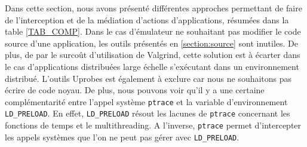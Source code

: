 Dans cette section, nous avons présenté différentes approches permettant de
faire de l'interception et de la médiation d'actions d'applications, résumées
dans la table \ref{TAB_COMP}. Dans le cas d'émulateur ne souhaitant pas modifier
le code source d'une application, les outils présentés en \ref{section:source}
sont inutiles. De plus, de par le surcoût d'utilisation de Valgrind, cette
solution est à écarter dans le cas d'applications distribuées large échelle
s'exécutant dans un environnement distribué. L'outils Uprobes est également à
exclure car nous ne souhaitons pas écrire de code noyau. De plus, nous pouvons
voir qu'il y a une certaine complémentarité entre l'appel
système \texttt{ptrace} et la variable d'environnement \texttt{LD\_PRELOAD}. En
effet, \texttt{LD\_PRELOAD} résout les lacunes de \texttt{ptrace} concernant les
fonctions de temps et le multithreading. A l'inverse, \texttt{ptrace} permet
d'intercepter les appels systèmes que l'on ne peut pas gérer
avec \texttt{LD\_PRELOAD}.

